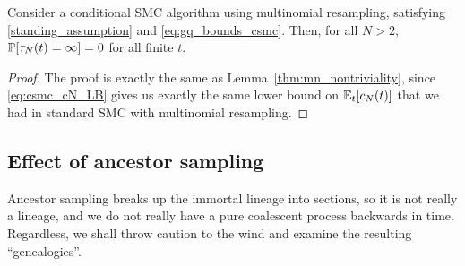 \begin{lemma}\label{thm:CSMC_nontriviality}
Consider a conditional SMC algorithm using multinomial resampling, satisfying \ref{standing_assumption} and \eqref{eq:gq_bounds_csmc}. 
Then, for all $N>2$, $\mathbb{P}[ \tau_N(t) = \infty ]=0$ for all finite $t$.
\end{lemma}

\begin{proof}
The proof is exactly the same as Lemma~\ref{thm:mn_nontriviality}, since \eqref{eq:csmc_cN_LB} gives us exactly the same lower bound on $\mathbb{E}_t [ c_N(t) ]$ that we had in standard SMC with multinomial resampling.
\end{proof}


\subsection{Effect of ancestor sampling}
Ancestor sampling breaks up the immortal lineage into sections, so it is not really a lineage, and we do not really have a pure coalescent process backwards in time. Regardless, we shall throw caution to the wind and examine the resulting ``genealogies''.

